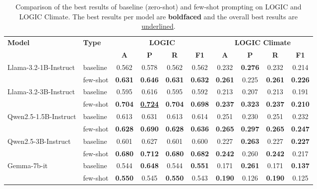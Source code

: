 \documentclass[runningheads]{llncs}
\begin{document}
\begin{table}[!ht]
\caption{Comparison of the best results of baseline (zero-shot) and few-shot prompting on LOGIC and LOGIC Climate. The best results per model are \textbf{boldfaced} and the overall best results are \underline{underlined}.}
\label{tab:performance}
\centering
\renewcommand{\arraystretch}{1.0} %
\setlength{\tabcolsep}{5pt} %
\begin{adjustbox}{max width=\textwidth}
\begin{tabular}{llcccccccc}
\toprule
\multirow{2}{*}{\textbf{Model}} & \multirow{2}{*}{\textbf{Type}} & \multicolumn{4}{c}{\textbf{LOGIC}} & \multicolumn{4}{c}{\textbf{LOGIC Climate}} \\
\cmidrule(lr){3-6} \cmidrule(lr){7-10}
& & \textbf{A} & \textbf{P} & \textbf{R} & \textbf{F1} & \textbf{A} & \textbf{P} & \textbf{R} & \textbf{F1} \\
\midrule
\multirow{2}{*}{Llama-3.2-1B-Instruct} & baseline & 0.562 & 0.578 & 0.562 & 0.562 & 0.232 & \textbf{0.276} & 0.232 & 0.214 \\
& few-shot & \textbf{0.631} & \textbf{0.646} & \textbf{0.631} & \textbf{0.632} & \textbf{0.261} & 0.225 & \textbf{0.261} & \textbf{0.226} \\
\midrule
\multirow{2}{*}{Llama-3.2-3B-Instruct} & baseline & 0.595 & 0.616 & 0.595 & 0.592 & 0.213 & 0.207 & 0.213 & 0.191 \\
& few-shot & \textbf{0.704} & \underline{\textbf{0.724}} & \textbf{0.704} & \textbf{0.698} & \textbf{0.237} & \textbf{0.323} & \textbf{0.237} & \textbf{0.210} \\
\midrule
\multirow{2}{*}{Qwen2.5-1.5B-Instruct} & baseline & 0.613 & 0.631 & 0.613 & 0.614 & 0.251 & 0.230 & 0.251 & 0.232 \\
& few-shot & \textbf{0.628} & \textbf{0.690} & \textbf{0.628} & \textbf{0.636} & \textbf{0.265} & \textbf{0.297} & \textbf{0.265} & \textbf{0.247} \\
\midrule
\multirow{2}{*}{Qwen2.5-3B-Instruct} & baseline & 0.601 & 0.627 & 0.601 & 0.600 & 0.227 & \textbf{0.263} & 0.227 & \textbf{0.227} \\
& few-shot & \textbf{0.680} & \textbf{0.712} & \textbf{0.680} & \textbf{0.682} & \textbf{0.242} & 0.260 & \textbf{0.242} & 0.217 \\
\midrule
\multirow{2}{*}{Gemma-7b-it} & baseline & 0.544 & \textbf{0.648} & 0.544 & \textbf{0.551} & 0.171 & \textbf{0.261} & 0.171 & \textbf{0.137} \\
& few-shot & \textbf{0.550} & 0.545 & \textbf{0.550} & 0.543 & \textbf{0.190} & 0.126 & \textbf{0.190} & 0.125 \\

\end{tabular}
\end{adjustbox}
\end{table}
\end{document}
